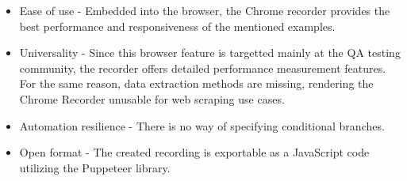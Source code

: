 \begin{itemize}
    \item Ease of use - Embedded into the browser, the Chrome recorder provides the best performance and responsiveness of the mentioned examples.  

    \item Universality - Since this browser feature is targetted mainly at the \ac{QA} testing community, the recorder offers detailed performance measurement features.
    For the same reason, data extraction methods are missing, rendering the Chrome Recorder unusable for web scraping use cases.    

    \item Automation resilience -
    There is no way of specifying conditional branches. 
    
    \item Open format - The created recording is exportable as a JavaScript code utilizing the Puppeteer library.
\end{itemize}
\renewcommand\cellgape{\Gape[4pt]}

